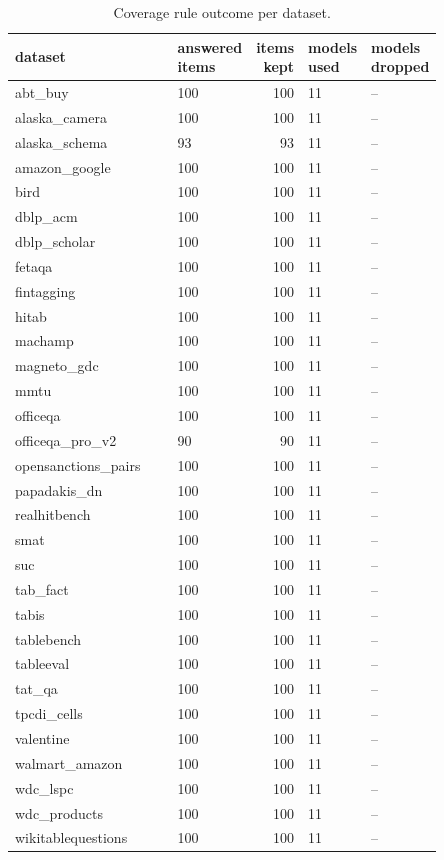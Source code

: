 \scriptsize
\setlength{\tabcolsep}{3pt}
\begin{longtable}{p{0.446\linewidth}p{0.145\linewidth}rp{0.114\linewidth}p{0.145\linewidth}}
\caption{Coverage rule outcome per dataset.}\label{tab:coverage}\\
\toprule
dataset & answered items & items kept & models used & models dropped \\
\midrule
abt\_\allowbreak{}buy & 100 & 100 & 11 & -- \\
alaska\_\allowbreak{}camera & 100 & 100 & 11 & -- \\
alaska\_\allowbreak{}schema & 93 & 93 & 11 & -- \\
amazon\_\allowbreak{}google & 100 & 100 & 11 & -- \\
bird & 100 & 100 & 11 & -- \\
dblp\_\allowbreak{}acm & 100 & 100 & 11 & -- \\
dblp\_\allowbreak{}scholar & 100 & 100 & 11 & -- \\
fetaqa & 100 & 100 & 11 & -- \\
fintagging & 100 & 100 & 11 & -- \\
hitab & 100 & 100 & 11 & -- \\
machamp & 100 & 100 & 11 & -- \\
magneto\_\allowbreak{}gdc & 100 & 100 & 11 & -- \\
mmtu & 100 & 100 & 11 & -- \\
officeqa & 100 & 100 & 11 & -- \\
officeqa\_\allowbreak{}pro\_\allowbreak{}v2 & 90 & 90 & 11 & -- \\
opensanctions\_\allowbreak{}pairs & 100 & 100 & 11 & -- \\
papadakis\_\allowbreak{}dn & 100 & 100 & 11 & -- \\
realhitbench & 100 & 100 & 11 & -- \\
smat & 100 & 100 & 11 & -- \\
suc & 100 & 100 & 11 & -- \\
tab\_\allowbreak{}fact & 100 & 100 & 11 & -- \\
tabis & 100 & 100 & 11 & -- \\
tablebench & 100 & 100 & 11 & -- \\
tableeval & 100 & 100 & 11 & -- \\
tat\_\allowbreak{}qa & 100 & 100 & 11 & -- \\
tpcdi\_\allowbreak{}cells & 100 & 100 & 11 & -- \\
valentine & 100 & 100 & 11 & -- \\
walmart\_\allowbreak{}amazon & 100 & 100 & 11 & -- \\
wdc\_\allowbreak{}lspc & 100 & 100 & 11 & -- \\
wdc\_\allowbreak{}products & 100 & 100 & 11 & -- \\
wikitablequestions & 100 & 100 & 11 & -- \\
\bottomrule
\end{longtable}
\normalsize
